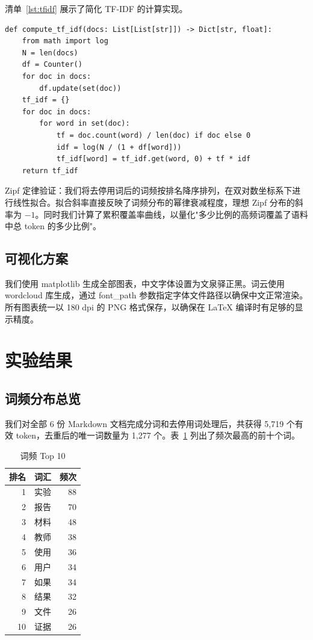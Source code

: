 \documentclass[12pt,a4paper]{ctexart}
\begin{document}
清单~\ref{lst:tfidf} 展示了简化 TF-IDF 的计算实现。

\begin{lstlisting}[caption={简化 TF-IDF 计算}, label={lst:tfidf}]
def compute_tf_idf(docs: List[List[str]]) -> Dict[str, float]:
    from math import log
    N = len(docs)
    df = Counter()
    for doc in docs:
        df.update(set(doc))
    tf_idf = {}
    for doc in docs:
        for word in set(doc):
            tf = doc.count(word) / len(doc) if doc else 0
            idf = log(N / (1 + df[word]))
            tf_idf[word] = tf_idf.get(word, 0) + tf * idf
    return tf_idf
\end{lstlisting}

Zipf 定律验证：我们将去停用词后的词频按排名降序排列，在双对数坐标系下进行线性拟合。拟合斜率直接反映了词频分布的幂律衰减程度，理想 Zipf 分布的斜率为 \(-1\)。同时我们计算了累积覆盖率曲线，以量化"多少比例的高频词覆盖了语料中总 token 的多少比例"。

\subsection{可视化方案}

我们使用 matplotlib 生成全部图表，中文字体设置为文泉驿正黑。词云使用 wordcloud 库生成，通过 font\_path 参数指定字体文件路径以确保中文正常渲染。所有图表统一以 180 dpi 的 PNG 格式保存，以确保在 LaTeX 编译时有足够的显示精度。

\section{实验结果}

\subsection{词频分布总览}

我们对全部 6 份 Markdown 文档完成分词和去停用词处理后，共获得 5,719 个有效 token，去重后的唯一词数量为 1,277 个。表~\ref{tab:top10} 列出了频次最高的前十个词。

\begin{table}[htbp]
\centering
\caption{词频 Top 10}
\label{tab:top10}
\begin{tabular}{@{}rrr@{}}
\toprule
排名 & 词汇 & 频次 \\
\midrule
1 & 实验 & 88 \\
2 & 报告 & 70 \\
3 & 材料 & 48 \\
4 & 教师 & 38 \\
5 & 使用 & 36 \\
6 & 用户 & 34 \\
7 & 如果 & 34 \\
8 & 结果 & 32 \\
9 & 文件 & 26 \\
10 & 证据 & 26 \\
\bottomrule
\end{tabular}
\end{table}
\end{document}
